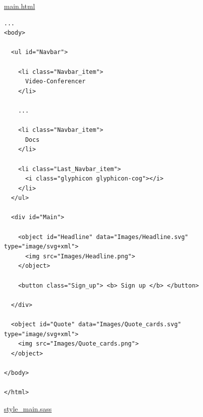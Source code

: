 \underline{main.html}

\begin{verbatim}
...
<body>
   
  <ul id="Navbar">

    <li class="Navbar_item">
      Video-Conferencer 
    </li>

    ...

    <li class="Navbar_item">
      Docs
    </li>

    <li class="Last_Navbar_item">
      <i class="glyphicon glyphicon-cog"></i>
    </li>
  </ul>

  <div id="Main">

    <object id="Headline" data="Images/Headline.svg" type="image/svg+xml">
      <img src="Images/Headline.png">
    </object>
	
    <button class="Sign_up"> <b> Sign up </b> </button> 

  </div>

  <object id="Quote" data="Images/Quote_cards.svg" type="image/svg+xml">
    <img src="Images/Quote_cards.png">
  </object>

</body>

</html>
\end{verbatim}

\underline{style\_main.sass}

